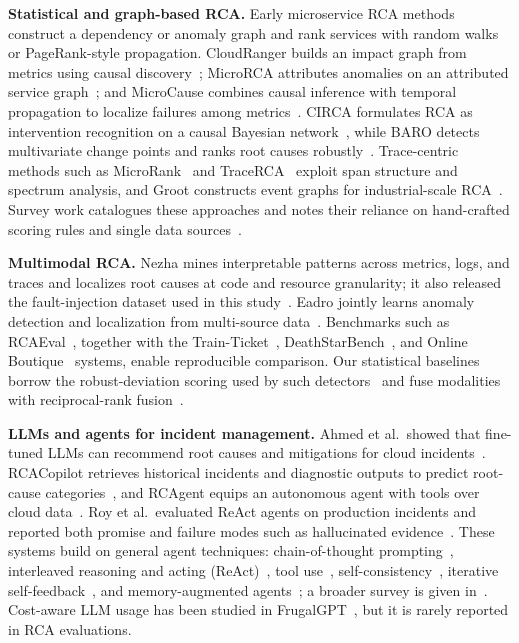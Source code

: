 \documentclass[conference]{IEEEtran}
\begin{document}
\textbf{Statistical and graph-based RCA.} Early microservice RCA methods construct a dependency or anomaly graph and rank services with random walks or PageRank-style propagation. CloudRanger builds an impact graph from metrics using causal discovery~\cite{wang2018cloudranger}; MicroRCA attributes anomalies on an attributed service graph~\cite{wu2020microrca}; and MicroCause combines causal inference with temporal propagation to localize failures among metrics~\cite{meng2020microcause}. CIRCA formulates RCA as intervention recognition on a causal Bayesian network~\cite{li2022circa}, while BARO detects multivariate change points and ranks root causes robustly~\cite{pham2024baro}. Trace-centric methods such as MicroRank~\cite{yu2021microrank} and TraceRCA~\cite{li2021tracerca} exploit span structure and spectrum analysis, and Groot constructs event graphs for industrial-scale RCA~\cite{wang2021groot}. Survey work catalogues these approaches and notes their reliance on hand-crafted scoring rules and single data sources~\cite{soldani2022survey}.

\textbf{Multimodal RCA.} Nezha mines interpretable patterns across metrics, logs, and traces and localizes root causes at code and resource granularity; it also released the fault-injection dataset used in this study~\cite{yu2023nezha}. Eadro jointly learns anomaly detection and localization from multi-source data~\cite{lee2023eadro}. Benchmarks such as RCAEval~\cite{pham2025rcaeval}, together with the Train-Ticket~\cite{zhou2021trainticket}, DeathStarBench~\cite{gan2019deathstarbench}, and Online Boutique~\cite{google2024onlineboutique} systems, enable reproducible comparison. Our statistical baselines borrow the robust-deviation scoring used by such detectors~\cite{leys2013mad} and fuse modalities with reciprocal-rank fusion~\cite{cormack2009rrf}.

\textbf{LLMs and agents for incident management.} Ahmed et al.\ showed that fine-tuned LLMs can recommend root causes and mitigations for cloud incidents~\cite{ahmed2023recommending}. RCACopilot retrieves historical incidents and diagnostic outputs to predict root-cause categories~\cite{chen2024rcacopilot}, and RCAgent equips an autonomous agent with tools over cloud data~\cite{wang2024rcagent}. Roy et al.\ evaluated ReAct agents on production incidents and reported both promise and failure modes such as hallucinated evidence~\cite{roy2024exploring}. These systems build on general agent techniques: chain-of-thought prompting~\cite{wei2022cot}, interleaved reasoning and acting (ReAct)~\cite{yao2023react}, tool use~\cite{schick2023toolformer}, self-consistency~\cite{wang2023selfconsistency}, iterative self-feedback~\cite{madaan2023selfrefine,shinn2023reflexion}, and memory-augmented agents~\cite{park2023generative}; a broader survey is given in~\cite{wang2024agentsurvey}. Cost-aware LLM usage has been studied in FrugalGPT~\cite{chen2023frugalgpt}, but it is rarely reported in RCA evaluations.
\end{document}

